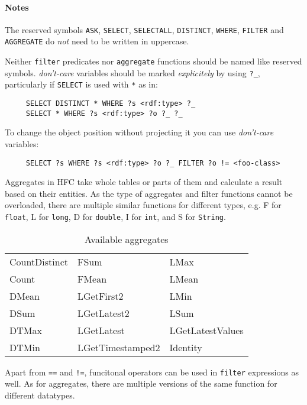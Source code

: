 \paragraph{Notes}

The reserved symbols \texttt{ASK}, \texttt{SELECT}, \texttt{SELECTALL},
\texttt{DISTINCT}, \texttt{WHERE}, \texttt{FILTER} and \texttt{AGGREGATE}
do \emph{not} need to be written in uppercase.

Neither \texttt{filter} predicates nor \texttt{aggregate} functions should be named like reserved symbols.
\emph{don't-care} variables should be marked \emph{explicitely} by using
\verb|?_|, particularly if \texttt{SELECT} is used with \verb|*| as in:
\begin{verbatim}
     SELECT DISTINCT * WHERE ?s <rdf:type> ?_
     SELECT * WHERE ?s <rdf:type> ?o ?_ ?_
\end{verbatim}
To change the object position without projecting it you can use \emph{don't-care} variables:
\begin{verbatim}
     SELECT ?s WHERE ?s <rdf:type> ?o ?_ FILTER ?o != <foo-class>
\end{verbatim}

Aggregates in HFC take whole tables or parts of them and calculate a result based on their entities. As the type of aggregates and filter functions cannot be overloaded, there are multiple similar functions for different types, e.g. F for \texttt{float}, L for \texttt{long}, D for \texttt{double}, I
for \texttt{int}, and S for \texttt{String}.

\begin{table}[htbp]
  \centering
 \begin{tabular}{lll}
   CountDistinct&  FSum&             LMax\\
   Count&          FMean&            LMean\\
   DMean&          LGetFirst2&       LMin\\
   DSum&           LGetLatest2&      LSum\\
   DTMax&          LGetLatest&       LGetLatestValues\\
   DTMin&          LGetTimestamped2& Identity     \\
 \end{tabular}
  \caption{Available aggregates}
  \label{tab:hfcaggregates}
\end{table}

Apart from \verb|==| and \verb|!=|, funcitonal operators can be used in \texttt{filter} expressions as well. As for aggregates, there are multiple versions of the same function for different datatypes.

